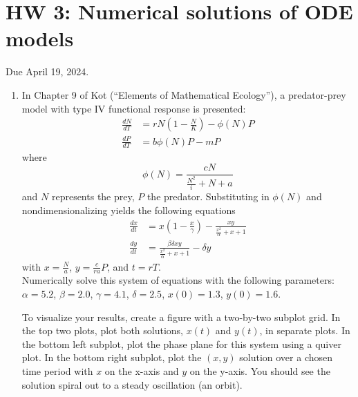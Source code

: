 \documentclass[11pt]{article}
\begin{document}
\section*{HW 3: Numerical solutions of ODE models}
Due April 19, 2024.

\begin{enumerate}
	\item In Chapter 9 of Kot (``Elements of Mathematical Ecology''), a predator-prey model with type IV functional response is presented:
	\begin{align*}
		\frac{dN}{dT} &= rN\left(1-\frac{N}{K}\right) - \phi(N)P\\
		\frac{dP}{dT} &= b\phi(N)P-mP
	\end{align*}
	where
	\[
	\phi(N) = \frac{cN}{\frac{N^2}{i}+N+a}
	\]
	and $N$ represents the prey, $P$ the predator. Substituting in $\phi(N)$ and nondimensionalizing yields the following equations
	\begin{align*}
		\frac{dx}{dt} &= x\left(1-\frac{x}{\gamma}\right) - \frac{xy}{\frac{x^2}{\alpha}+x+1}\\
		\frac{dy}{dt} &= \frac{\beta\delta xy}{\frac{x^2}{\alpha}+x+1} - \delta y
	\end{align*}
	with $x=\frac{N}{a}$, $y=\frac{c}{ra}P$, and $t=rT$.\\
	Numerically solve this system of equations with the following parameters:\\
	$\alpha=5.2$, $\beta=2.0$, $\gamma=4.1$, $\delta=2.5$, $x(0)=1.3$, $y(0)=1.6$.
	
	To visualize your results, create a figure with a two-by-two subplot grid. In the top two plots, plot both solutions, $x(t)$ and $y(t)$, in separate plots. In the bottom left subplot, plot the phase plane for this system using a quiver plot. In the bottom right subplot, plot the $(x,y)$ solution over a chosen time period with $x$ on the x-axis and $y$ on the y-axis. You should see the solution spiral out to a steady oscillation (an orbit).
	

\end{enumerate}
\end{document}
